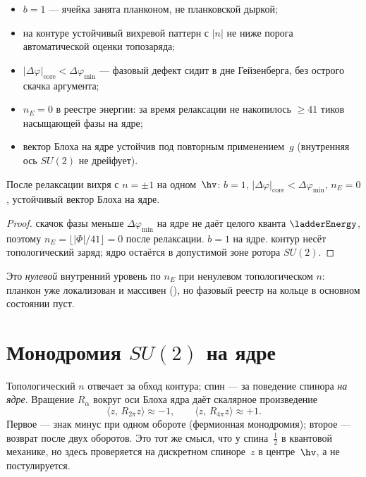\begin{itemize}[noitemsep]
\item $b=1$ --- ячейка занята планконом, не планковской дыркой;
\item на контуре устойчивый вихревой паттерн с $|n|$ не ниже порога автоматической оценки топозаряда;
\item $|\Delta\varphi|_{\mathrm{core}} < \Delta\varphi_{\min}$ --- фазовый дефект сидит
  в дне Гейзенберга, без острого скачка аргумента;
\item $n_E=0$ в реестре энергии: за время релаксации не накопилось
  $\ge 41$ тиков насыщающей фазы на ядре;
\item вектор Блоха на ядре устойчив под повторным применением~$g$
  (внутренняя ось $SU(2)$ не дрейфует).
\end{itemize}

\begin{proposition}
\label{prop:floor0-vortex-ground}
После релаксации вихря с $n=\pm1$ на одном~$\hv$:
$b=1$, $|\Delta\varphi|_{\mathrm{core}}<\Delta\varphi_{\min}$, $n_E=0$,
устойчивый вектор Блоха на ядре.
\end{proposition}

\begin{proof}
скачок фазы меньше $\Delta\varphi_{\min}$ на ядре не даёт целого кванта $\ladderEnergy$,
поэтому $n_E=\lfloor|\Phi|/41\rfloor=0$ после релаксации.
$b=1$ на ядре.
контур несёт топологический заряд; ядро остаётся в допустимой зоне ротора $SU(2)$.
\end{proof}

Это \emph{нулевой} внутренний уровень по $n_E$ при ненулевом топологическом $n$:
планкон уже локализован и массивен (), но фазовый реестр на кольце
в основном состоянии пуст.

\section{Монодромия \texorpdfstring{$SU(2)$}{SU(2)} на ядре}
\label{sec:floor0-su2}

Топологический $n$ отвечает за обход контура; спин --- за поведение спинора \emph{на ядре}.
Вращение $R_\alpha$ вокруг оси Блоха ядра даёт скалярное произведение
\[
  \langle z,\, R_{2\pi} z\rangle \approx -1,
  \qquad
  \langle z,\, R_{4\pi} z\rangle \approx +1.
\]
Первое --- знак минус при одном обороте (фермионная монодромия);
второе --- возврат после двух оборотов.
Это тот же смысл, что у спина~$\tfrac12$ в квантовой механике,
но здесь проверяется на дискретном спиноре~$z$ в центре~$\hv$, а не постулируется.

